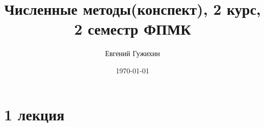 \documentclass[a5paper,10pt]{article}
\author{Евгений Гужихин}
\title{Численные методы(конспект), 2 курс, 2 семестр ФПМК}
\date{\today}
\begin{document}
	\maketitle
	\tableofcontents{}
	\newpage

	\section{1 лекция}
\end{document}
